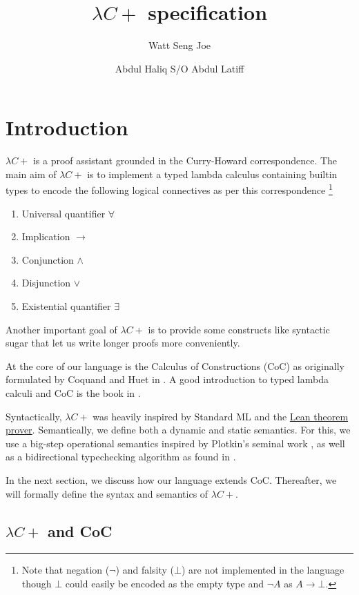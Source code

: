 \documentclass{article}
\title{$\lambda C+$ specification}
\author{Watt Seng Joe \and Abdul Haliq S/O Abdul Latiff}
\begin{document}
\maketitle
\tableofcontents
\newpage

\section{Introduction}
$\lambda C+$ is a proof assistant grounded in the Curry-Howard correspondence.
The main aim of $\lambda C+$ is to implement a typed lambda calculus containing
builtin types to encode the following logical connectives as per this
correspondence
\footnote{
  Note that negation ($\neg$) and falsity ($\bot$) are not implemented in the
  language though $\bot$ could easily be encoded as the empty type and $\neg A$
  as $A \rightarrow \bot$.
}

\begin{enumerate}
  \item Universal quantifier $\forall$
  \item Implication $\rightarrow$
  \item Conjunction $\wedge$
  \item Disjunction $\vee$ 
  \item Existential quantifier $\exists$
\end{enumerate}

Another important goal of $\lambda C+$ is to provide some constructs
like syntactic sugar that let us write longer proofs more conveniently.

At the core of our language is the Calculus of Constructions (CoC) as 
originally formulated by Coquand and Huet in \cite{coc_coquand_huet}.
A good introduction to typed lambda calculi and CoC is the book in 
\cite{type_theory_and_formal_proof}.

Syntactically, $\lambda C+$ was heavily inspired by Standard ML and the
\href{https://leanprover.github.io/}{Lean theorem prover}.
Semantically, we define both a dynamic and static semantics.
For this, we use a big-step operational semantics inspired by
Plotkin's seminal work \cite{plotkin_sos}, as well as a bidirectional typechecking
algorithm as found in \cite{lambdapi}. 

In the next section, we discuss how our language extends CoC. Thereafter, we
will formally define the syntax and semantics of $\lambda C+$.

\subsection{
  \texorpdfstring{$\lambda C+$}{Lambdacplus} and CoC
}
\end{document}
